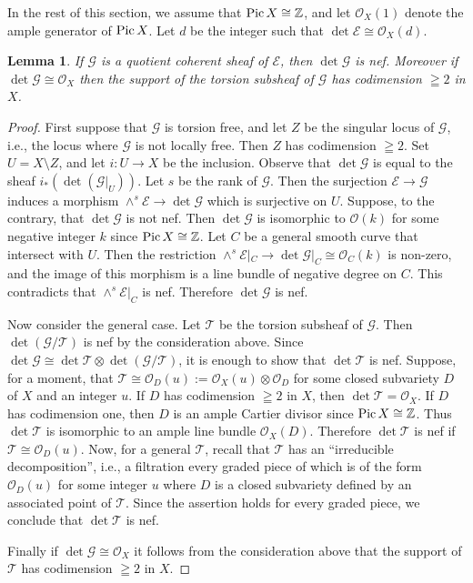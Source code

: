 \documentclass[a4paper,12pt]{amsart}
\newtheorem{lemma}[thm]{Lemma}%
\newcommand{\Pic}{\mathop{\rm Pic}\nolimits}
\begin{document}
In the rest of this section, we assume 
that $\Pic X\cong \mathbb{Z}$,
and let $\mathcal{O}_X(1)$ denote the ample generator of $\Pic X$.
Let $d$ be the integer such that $\det\mathcal{E}\cong \mathcal{O}_X(d)$.
\begin{lemma}\label{nefquotient}
If $\mathcal{G}$ is a quotient coherent sheaf of $\mathcal{E}$,
then $\det\mathcal{G}$ is nef.
Moreover if $\det\mathcal{G}\cong \mathcal{O}_X$
then the support of the torsion subsheaf of $\mathcal{G}$ has codimension $\geqq 2$ in $X$.
\end{lemma}
\begin{proof}
First suppose that $\mathcal{G}$ is torsion free,
and let $Z$ be the singular locus of $\mathcal{G}$,
i.e., the locus where $\mathcal{G}$ is not locally free. Then $Z$ has codimension $\geqq 2$.
Set $U=X\setminus Z$, and let $i:U\to X$ be the inclusion.
Observe that $\det \mathcal{G}$ is equal to the sheaf $i_*(\det(\mathcal{G}|_U))$.
Let $s$ be the rank of $\mathcal{G}$.
Then the surjection $\mathcal{E}\to \mathcal{G}$ induces a morphism $\wedge^{s}\mathcal{E}\to \det\mathcal{G}$
which is surjective on $U$.
Suppose, to the contrary, that $\det\mathcal{G}$ is not nef.
Then $\det\mathcal{G}$ is isomorphic to $\mathcal{O}(k)$ for some negative integer $k$
since $\Pic X\cong \mathbb{Z}$.
Let $C$ be a general smooth curve that intersect with $U$.
Then the restriction $\wedge^{s}\mathcal{E}|_C\to \det\mathcal{G}|_C\cong \mathcal{O}_C(k)$ is non-zero,
and the image of this morphism is a line bundle of negative degree on $C$.
This contradicts that $\wedge^{s}\mathcal{E}|_C$ is nef.
Therefore $\det\mathcal{G}$ is nef.

Now consider the general case. Let $\mathcal{T}$ be the torsion subsheaf of $\mathcal{G}$.
Then $\det(\mathcal{G}/\mathcal{T})$ is nef by the consideration above.
Since $\det\mathcal{G}\cong \det\mathcal{T}\otimes \det(\mathcal{G}/\mathcal{T})$,
it is enough to show that $\det\mathcal{T}$ is nef.
Suppose, for a moment, that $\mathcal{T}\cong \mathcal{O}_D(u):=\mathcal{O}_X(u)\otimes\mathcal{O}_D$ 
for some closed subvariety $D$ of $X$
and an integer $u$.
If $D$ has codimension $\geqq 2$ in $X$, then $\det\mathcal{T}=\mathcal{O}_X$.
If $D$ has codimension one, then $D$ is an ample Cartier divisor since $\Pic X\cong \mathbb{Z}$.
Thus $\det\mathcal{T}$ is isomorphic to an ample line bundle $\mathcal{O}_X(D)$.
Therefore $\det\mathcal{T}$ is nef if $\mathcal{T}\cong \mathcal{O}_D(u)$.
Now, for a general $\mathcal{T}$, recall that $\mathcal{T}$ has an ``irreducible decomposition'',
i.e., a filtration every graded piece of which is of the form $\mathcal{O}_D(u)$ for 
some 
integer $u$
where $D$ is a closed subvariety 
defined by an associated point of $\mathcal{T}$.
Since the assertion holds for every graded piece, we conclude that $\det\mathcal{T}$ is nef.

Finally if $\det\mathcal{G}\cong \mathcal{O}_X$ it follows from the consideration above 
that the support of $\mathcal{T}$ has codimension $\geqq 2$ in $X$.
\end{proof}
\end{document}
